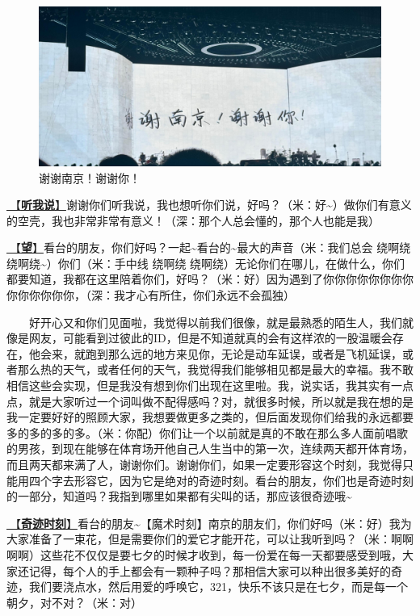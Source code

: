 \documentclass[]{ctexbook}
\begin{document}
\begin{figure}

{\centering \includegraphics[width=400pt]{img/nanjing20240811/thank-nanjing} 

}

\caption{谢谢南京！谢谢你！}\label{fig:unnamed-chunk-77}
\end{figure}

\hyperref[listen-to-me]{🎵【\textbf{听我说}】}谢谢你们听我说，我也想听你们说，好吗？（米：好\textasciitilde）做你们有意义的空壳，我也非常非常有意义！（深：那个人总会懂的，那个人也能是我）

\hyperref[Gaze]{🎵【\textbf{望}】}看台的朋友，你们好吗？一起\textasciitilde 看台的\textasciitilde 最大的声音（米：我们总会 绕啊绕 绕啊绕\textasciitilde）你们（米：手中线 绕啊绕 绕啊绕）无论你们在哪儿，在做什么，你们都要知道，我都在这里陪着你们，好吗？（米：好）因为遇到了你你你你你你你你你你你你你你，（深：我才心有所住，你们永远不会孤独）

  好开心又和你们见面啦，我觉得以前我们很像，就是最熟悉的陌生人，我们就像是网友，可能看到过彼此的ID，但是不知道就真的会有这样浓的一股温暖会存在，他会来，就跑到那么远的地方来见你，无论是动车延误，或者是飞机延误，或者那么热的天气，或者任何的天气，我觉得我们能够相见都是最大的幸福。我不敢相信这些会实现，但是我没有想到你们出现在这里啦。我，说实话，我其实有一点点，就是大家听过一个词叫做不配得感吗？对，就很多时候，所以就是我在想的是我一定要好好的照顾大家，我想要做更多之类的，但后面发现你们给我的永远都要多的多的多的多。（米：你配）你们让一个以前就是真的不敢在那么多人面前唱歌的男孩，到现在能够在体育场开他自己人生当中的第一次，连续两天都开体育场，而且两天都来满了人，谢谢你们。谢谢你们，如果一定要形容这个时刻，我觉得只能用四个字去形容它，因为它是绝对的奇迹时刻。看台的朋友，你们也是奇迹时刻的一部分，知道吗？我指到哪里如果都有尖叫的话，那应该很奇迹哦\textasciitilde{}

\hyperref[magic-moment]{🎵【\textbf{奇迹时刻}】}看台的朋友\textasciitilde【魔术时刻】南京的朋友们，你们好吗（米：好）我为大家准备了一束花，但是需要你们的爱它才能开花，可以让我听到吗？（米：啊啊啊啊）这些花不仅仅是要七夕的时候才收到，每一份爱在每一天都要感受到哦，大家还记得，每个人的手上都会有一颗种子吗？那相信大家可以种出很多美好的奇迹，我们要浇点水，然后用爱的呼唤它，321，快乐不该只是在七夕，而是每一个朝夕，对不对？（米：对）
\end{document}
